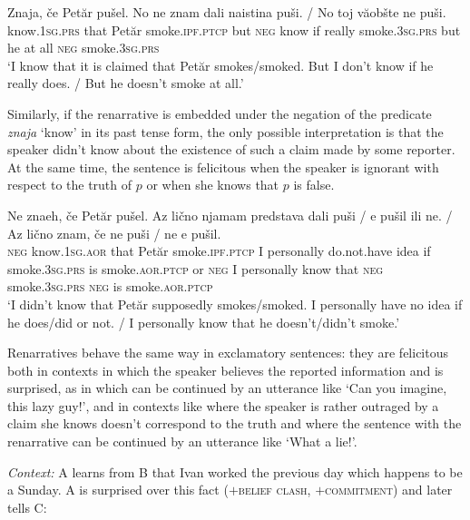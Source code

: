 \documentclass[output=paper,
colorlinks,
citecolor=brown,
newtxmath
]{langscibook}
\begin{document}
\ea\label{ex:znam}
\gll Znaja, če Petăr pušel. No ne znam dali naistina puši. {/} No toj văobšte ne puši.\\
know.\textsc{1sg.prs} that Petăr smoke.\textsc{ipf.ptcp} but \textsc{neg} know if really smoke.\textsc{3sg.prs} {} but he {at all} \textsc{neg} smoke.\textsc{3sg.prs}\\
\glt `I know that it is claimed that Petăr smokes/smoked. But I don't know if he really does. / But he doesn't smoke at all.'
\z

\noindent Similarly, if the renarrative is embedded under the negation of the predicate \textit{znaja} `know' in its past tense form, the only possible interpretation is that the speaker didn't know about the existence of such a claim made by some reporter. At the same time, the sentence is felicitous when the speaker is ignorant with respect to the truth of $p$ or when she knows that $p$ is false.

\ea
\gll Ne znaeh, če Petăr pušel. Az lično njamam predstava dali puši / e pušil ili ne. / Az lično znam, če ne puši / ne e pušil.\\
\textsc{neg} know.\textsc{1sg.aor} that Petăr smoke.\textsc{ipf.ptcp} I personally do.not.have idea if smoke.\textsc{3sg.prs} {} is smoke.\textsc{aor.ptcp} or \textsc{neg} {} I personally know that \textsc{neg} smoke.\textsc{3sg.prs} {} \textsc{neg} is smoke.\textsc{aor.ptcp}\\
\glt `I didn't know that Petăr supposedly smokes/smoked. I personally have no idea if he does/did or not. / I personally know that he doesn't/didn't smoke.'
\z

\noindent Renarratives behave the same way in exclamatory sentences: they are felicitous both in contexts in which the speaker believes the reported information and is surprised, as in  which can be continued by an utterance like `Can you imagine, this lazy guy!', and in contexts like  where the speaker is rather outraged by a claim she knows doesn't correspond to the truth and where the sentence with the renarrative can be continued by an utterance like `What a lie!'.

\eanoraggedright\label{ex:lazy-guy}
 \textit{Context:} A learns from B that Ivan worked the previous day which happens to be a Sunday. A is surprised over this fact ($+$\textsc{belief clash}, \hspace{0pt}$+$\textsc{commitment}) and later tells C:\vspace{-6pt}
 \z
\begin{exe}
\end{exe}
\end{document}

